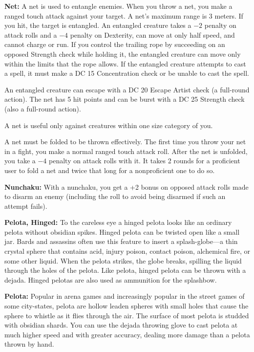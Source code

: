\textbf{Net:} A net is used to entangle enemies. When you throw a net, you make a ranged touch attack against your target. A net's maximum range is 3 meters. If you hit, the target is entangled. An entangled creature takes a $-2$ penalty on attack rolls and a $-4$ penalty on Dexterity, can move at only half speed, and cannot charge or run. If you control the trailing rope by succeeding on an opposed Strength check while holding it, the entangled creature can move only within the limits that the rope allows. If the entangled creature attempts to cast a spell, it must make a DC 15 Concentration check or be unable to cast the spell.

An entangled creature can escape with a DC 20 Escape Artist check (a full-round action). The net has 5 hit points and can be burst with a DC 25 Strength check (also a full-round action).

A net is useful only against creatures within one size category of you.

A net must be folded to be thrown effectively. The first time you throw your net in a fight, you make a normal ranged touch attack roll. After the net is unfolded, you take a $-4$ penalty on attack rolls with it. It takes 2 rounds for a proficient user to fold a net and twice that long for a nonproficient one to do so. 

\textbf{Nunchaku:} With a nunchaku, you get a +2 bonus on opposed attack rolls made to disarm an enemy (including the roll to avoid being disarmed if such an attempt fails). 

\textbf{Pelota, Hinged:} To the careless eye a hinged pelota looks like an ordinary pelota without obsidian spikes. Hinged pelota can be twisted open like a small jar. Bards and assassins often use this feature to insert a splash-globe---a thin crystal sphere that contains acid, injury poison, contact poison, alchemical fire, or some other liquid. When the pelota strikes, the globe breaks, spilling the liquid through the holes of the pelota. Like pelota, hinged pelota can be thrown with a dejada. Hinged pelotas are also used as ammunition for the splashbow.

\textbf{Pelota:} Popular in arena games and increasingly popular in the street games of some city-states, pelota are hollow leaden spheres with small holes that cause the sphere to whistle as it flies through the air. The surface of most pelota is studded with obsidian shards. You can use the dejada throwing glove to cast pelota at much higher speed and with greater accuracy, dealing more damage than a pelota thrown by hand.

